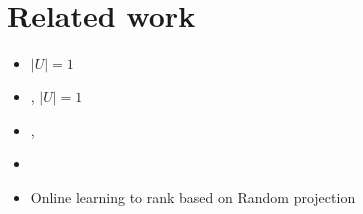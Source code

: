 \documentclass{article}
\begin{document}
\section{Related work}

\begin{itemize}
\item \cite{Ailon-2014} $|U| = 1$
\item \cite{Helmbold-Warmuth-2009}, \cite{Yasutake-Hatano-Kijima-Takimoto-Takeda-2011} $|U| = 1$
\item \cite{Feige-Lovasz-Tetali-2004}, \cite{Azar-Gamzu-Yin-2009}
\item \cite{Radlinski-Kleinberg-Joachims-2008}
\item Online learning to rank based on Random projection \cite{Schuth-Oosterhuis-Whiteson-de-Rijke-2016}
\end{itemize}



\end{document}
